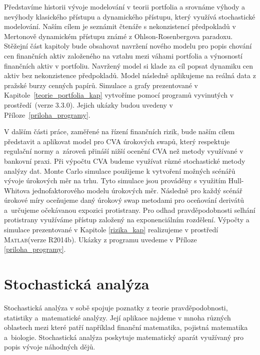\documentclass[a4paper,12pt]{report}
\makeatletter
\theoremstyle{definition} \newtheorem{definice}[veta]{Definice}
\theoremstyle{remark}
\newcommand{\MATLAB}{\textsc{Matlab}\xspace}
\def\R{\scalebox{\f@size}{\usebox\rbox}\xspace}
\makeatother
\begin{document}
Představíme historii vývoje modelování v teorii portfolia a srovnáme výhody a nevýhody klasického přístupu a dynamického přístupu, který využívá stochastické modelování.
Naším cílem je seznámit čtenáře s nekonzistencí předpokladů v Mertonově dynamickém přístupu známé z Ohlson-Rosenbergova paradoxu.
Stěžejní část kapitoly bude obsahovat navržení nového modelu pro popis chování cen finančních aktiv založeného na vztahu mezi váhami portfolia a výnosností finančních aktiv v portfoliu.
Navržený model si klade za cíl popsat dynamiku cen aktiv bez nekonzistence předpokladů.
Model následně aplikujeme na reálná data z pražské burzy cenných papírů.
Simulace a grafy prezentované v Kapitole~\ref{teorie_portfolia_kap} vytvoříme pomocí programů vyvinutých v prostředí~\R (verze 3.3.0).
Jejich ukázky budou uvedeny v Příloze~\ref{priloha_programy}.

V dalším části práce, zaměřené na  řízení finančních rizik, bude naším cílem představit a aplikovat model pro CVA úrokových swapů, který respektuje regulační normy a~zároveň přináší nižší ocenění CVA než metody využívané v bankovní praxi.
Při výpočtu CVA budeme využívat různé stochastické metody analýzy dat.
Monte Carlo simulace použijeme k vytvoření  možných scénářů vývoje úrokových měr na trhu. 
Tyto simulace jsou prováděny s využitím Hull-Whitova jednofaktorového modelu úrokových měr.
Následně pro každý scénář úrokové míry oceňujeme daný úrokový swap metodami pro oceňování derivátů a~určujeme očekávanou expozici protistrany.
Pro odhad pravděpodobnosti selhání protistrany využíváme přístup založený na exponenciálním rozdělení.
Výpočty a simulace prezentované v Kapitole \ref{rizika_kap} realizujeme v prostředí \MATLAB (verze  R2014b).
Ukázky z programu uvedeme v Příloze \ref{priloha_programy}.


\chapter{Stochastická analýza}\label{stochasticka_analyza_kap}
Stochastická analýza v sobě spojuje poznatky z teorie pravděpodobnosti, statistiky a~matematické analýzy.
Její aplikace najdeme v mnoha různých oblastech mezi které patří například finanční matematika, pojistná matematika a~biologie.
Stochastická analýza poskytuje matematický aparát využívaný pro popis vývoje náhodných dějů.
\end{document}
